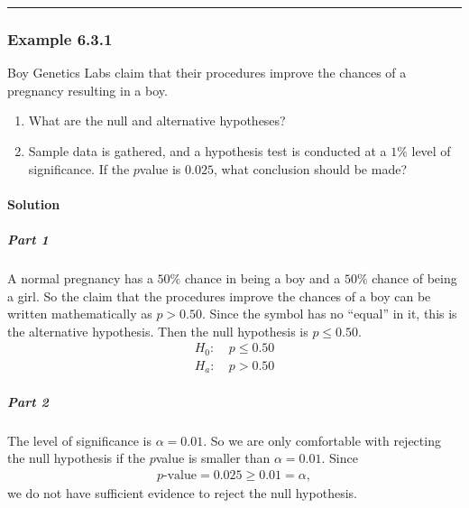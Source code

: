 \documentclass[letterpaper,10pt,english]{jupyterBook}
\begin{document}
\bigskip\hrule\bigskip



\subsubsection{Example 6.3.1}
\label{\detokenize{Ch6 An Introduction to Hypothesis Testing/6.3 Drawing a Conclusion:example-6-3-1}}
\sphinxAtStartPar
Boy Genetics Labs claim that their procedures improve the chances of a pregnancy resulting in a boy.
\begin{enumerate}
%
\item {} 
\sphinxAtStartPar
What are the null and alternative hypotheses?

\item {} 
\sphinxAtStartPar
Sample data is gathered, and a hypothesis test is conducted at a \(1\%\) level of significance. If the \(p\)\sphinxhyphen{}value is \(0.025\), what conclusion should be made?

\end{enumerate}


\paragraph{Solution}
\label{\detokenize{Ch6 An Introduction to Hypothesis Testing/6.3 Drawing a Conclusion:solution}}

\subparagraph{Part 1}
\label{\detokenize{Ch6 An Introduction to Hypothesis Testing/6.3 Drawing a Conclusion:part-1}}
\sphinxAtStartPar
A normal pregnancy has a \(50\%\) chance in being a boy and a \(50\%\) chance of being a girl. So the claim that the procedures improve the chances of a boy can be written mathematically as \(p > 0.50\). Since the symbol has no “equal” in it, this is the alternative hypothesis. Then the null hypothesis is \(p \leq 0.50\).
\begin{align*}
H_0:&\ p \leq 0.50 \\
H_a:&\ p > 0.50
\end{align*}

\subparagraph{Part 2}
\label{\detokenize{Ch6 An Introduction to Hypothesis Testing/6.3 Drawing a Conclusion:part-2}}
\sphinxAtStartPar
The level of significance is \(\alpha = 0.01\). So we are only comfortable with rejecting the null hypothesis if the \(p\)\sphinxhyphen{}value is smaller than \(\alpha = 0.01\). Since
\begin{equation*}
\begin{split}p\text{-value} = 0.025 \geq 0.01 = \alpha, \end{split}
\end{equation*}
\sphinxAtStartPar
we do not have sufficient evidence to reject the null hypothesis.
\end{document}
